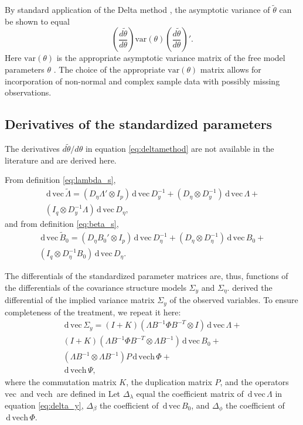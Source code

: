 \documentclass[a4paper, 11pt]{article}
\newcommand{\n}{\eta}
\renewcommand{\l}{\lambda}
\renewcommand{\b}{\beta}
\newcommand{\p}{\phi}
\renewcommand{\d}{\,\mathrm{d}\,}
\newcommand{\kronprod}{\otimes}
\renewcommand{\vec}{\mathrm{vec}\,}
\newcommand{\vech}{\mathrm{vech}\,}
\newcommand{\Lambdastan}{\tilde{\Lambda}}
\newcommand{\Bstan}{\tilde{B}}
\newcommand{\thetastan}{\tilde{\theta}}
\newcommand{\0}{\boldsymbol{0}}
\newcommand{\var}{\mathrm{var}}
\begin{document}

By standard application of the Delta method \citep[e.g.][]{oehlert1992note}, the asymptotic variance of $\thetastan$ can be shown to equal
\begin{equation}\label{eq:deltamethod}
	\left(\frac{d \thetastan}{d \theta}\right) 
		\var(\theta) 
	\left(\frac{d \thetastan}{d \theta}\right)'.
\end{equation}
Here $\var(\theta)$ is the appropriate asymptotic variance matrix of the free model parameters $\theta$ \cite[e.g.][]{satorra1989alternative}.
The choice of the appropriate $\var(\theta)$ matrix allows for incorporation of 
non-normal and complex sample data with possibly missing observations.



\subsection{Derivatives of the standardized parameters}


The derivatives $d \thetastan / d \theta$ in equation \ref{eq:deltamethod} are not available in the literature and are derived here.

From definition \ref{eq:lambda_s}, 
\begin{multline}\label{eq:dveclam}
\d\vec\Lambdastan = 
    (D_\n \Lambda' \kronprod I_p) \d \vec D_y^{-1} + 
    (D_\n \kronprod D_y^{-1}) \d\vec\Lambda + \\
    (I_q \kronprod D_y^{-1} \Lambda) \d\vec D_\n,
\end{multline}
and from definition \ref{eq:beta_s}, 
\begin{multline}\label{eq:dvecbeta}
\d\vec \Bstan_0 = 
    (D_\n B_0' \kronprod I_p) \d \vec D_\n^{-1} + 
    (D_\n \kronprod D_\n^{-1}) \d\vec B_0 + \\
    (I_q \kronprod D_\n^{-1} B_0) \d\vec D_\n.
\end{multline}

The differentials of the standardized parameter matrices are, thus, 
functions of the differentials of the covariance structure models $\Sigma_y$
and
$\Sigma_\n$.
\cite{neudecker1991linear} derived the differential of the implied variance
matrix $\Sigma_y$ of the observed variables. To ensure completeness of the treatment, we repeat it here:
\begin{equation}\label{eq:delta_y}
\begin{split}
\d\vec \Sigma_y = (I + K) (\Lambda B^{-1} \Phi B^{-T} \kronprod I) 
\d\vec\Lambda 
+ \\
(I + K) (\Lambda B^{-1} \Phi B^{-T} \kronprod \Lambda B^{-1}) \d\vec B_0
+ \\
(\Lambda B^{-1} \kronprod \Lambda B^{-1}) P \d \vech \Phi
+ \\
\d \vech \Psi,
\end{split}
\end{equation}
where the commutation matrix $K$, the duplication matrix $P$, and the operators
$\vec$ and $\vech$ are defined in \cite{magnus1988matrix}
Let $\Delta_\l$ equal the coefficient matrix
 of $\d\vec\Lambda$ in equation \ref{eq:delta_y}, 
$\Delta_\b$ the coefficient  of $\d\vec B_0$, and
$\Delta_\p$ the coefficient  of $\d\vech\Phi$.
\end{document}
